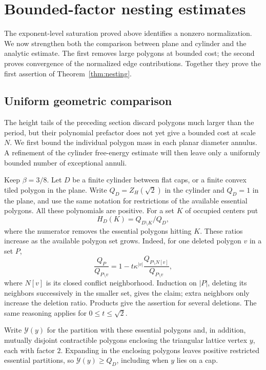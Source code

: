 \section{Bounded-factor nesting estimates}\label{sec:uniform-nesting}

The exponent-level saturation proved above identifies a nonzero normalization. We now strengthen both the comparison between plane and cylinder and the analytic estimate. The first removes large polygons at bounded cost; the second proves convergence of the normalized edge contributions. Together they prove the first assertion of Theorem~\ref{thm:nesting}.

\subsection{Uniform geometric comparison}\label{c6:uniform-geometry}

The height tails of the preceding section discard polygons much larger than the period, but their polynomial prefactor does not yet give a bounded cost at scale $N$. We first bound the individual polygon mass in each planar diameter annulus. A refinement of the cylinder free-energy estimate will then leave only a uniformly bounded number of exceptional annuli.

Keep $\beta=3/8$. Let $D$ be a finite cylinder between flat caps, or a finite convex tiled polygon in the plane. Write $Q_D=Z_H(\sqrt2)$ in the cylinder and $Q_D=1$ in the plane, and use the same notation for restrictions of the available essential polygons. All these polynomials are positive. For a set $K$ of occupied centers put
\[
 H_D(K)=Q_{D\setminus K}/Q_D,
\]
where the numerator removes the essential polygons hitting $K$. These ratios increase as the available polygon set grows. Indeed, for one deleted polygon $v$ in a set $P$,
\[
 \frac{Q_P}{Q_{P\setminus v}}
 =1-t\kappa^{|v|}\frac{Q_{P\setminus N[v]}}{Q_{P\setminus v}},
\]
where $N[v]$ is its closed conflict neighborhood. Induction on $|P|$, deleting its neighbors successively in the smaller set, gives the claim; extra neighbors only increase the deletion ratio. Products give the assertion for several deletions. The same reasoning applies for $0\le t\le\sqrt2$.

Write $\mathcal Y(y)$ for the partition with these essential polygons and, in addition, mutually disjoint contractible polygons enclosing the triangular lattice vertex $y$, each with factor $2$. Expanding in the enclosing polygons leaves positive restricted essential partitions, so $\mathcal Y(y)\ge Q_D$, including when $y$ lies on a cap.

